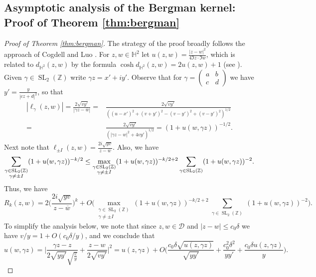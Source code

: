 \documentclass[12pt, a4paper]{amsart}
\newcommand{\tmop}[1]{\ensuremath{\operatorname{#1}}}
\theoremstyle{definition}
\newcommand {\1} {\mathbf{1}}
\newcommand {\Hb} {\mathbb {H}}
\newcommand {\Dc} {\mathcal{D}}
\numberwithin{equation}{section}
\begin{document}
\subsection{Asymptotic analysis of the Bergman kernel: Proof of Theorem \ref{thm:bergman}}
\label{sec:Bergman kernel}

\begin{proof}[Proof of Theorem \ref{thm:bergman}] The strategy of the proof broadly follows the approach of Cogdell and Luo \cite{cogdell-luo-2011}.
For $z,w \in \Hb^{2}$ let
$u(z,w)=\tfrac{|z-w|^2}{4\Im{z}\cdot \Im{w}}$, which is related to $d_{\mathbb H^2}(z,w)$ by the formula $\cosh d_{\mathbb H^2}(z,w)=2u(z,w)+1$ (see \cite[Equation (1.3)]{Iwaniec-2002}).
Given $\gamma \in \tmop{SL}_2(\mathbb Z)$
write $\gamma z=x'+iy'$. Observe that for $\gamma=\begin{pmatrix}
a & b \\
c & d
\end{pmatrix}$ we have $y'=\frac{y}{|cz+d|^2}$, so that
\begin{equation} \label{eq:distance}
\begin{split}
|\ell_{\gamma}(z,w)|=\frac{2\sqrt{vy' }}{|\gamma z-\overline w|}
=& \frac{2\sqrt{vy'}}{((u-x')^2+(v+y')^2-(v-y')^2+(v-y')^2)^{1/2}}\\
=& \frac{2\sqrt{vy'}}{(|\gamma z-w|^2+4vy')^{1/2}}
=(1+u(w,\gamma z))^{-1/2}.
\end{split}
\end{equation}
Next note that $\ell_{\pm I}(z,w)=\tfrac{2i\sqrt{yv}}{z-\overline w}$. Also,
we have
\begin{equation} \notag
\sum_{\substack{\gamma \in
\tmop{SL}_2(\mathbb Z) \\ \gamma \neq \pm I}} (1+u(w,\gamma z))^{-k/2} \le
\max_{\substack{\gamma \in \tmop{SL}_2(\mathbb Z) \\ \gamma\neq \pm I}}(1+u(w,\gamma z))^{-k/2+2}
\sum_{\substack{\gamma \in
\tmop{SL}_2(\mathbb Z) \\ }} (1+u(w,\gamma z))^{-2}.
\end{equation}
Thus, we have
\begin{equation} \label{eq:firststep}
R_k(z,w)=2 \bigg( \frac{2i\sqrt{yv}}{z-\overline w}\bigg)^k+O\bigg( \max_{\substack{\gamma \in \tmop{SL}_2(\mathbb Z) \\ \gamma\neq \pm I}}(1+u(w,\gamma z))^{-k/2+2}
\sum_{\substack{\gamma \in
\tmop{SL}_2(\mathbb Z) \\ }} (1+u(w,\gamma z))^{-2}   \bigg).
\end{equation}
To simplify the analysis below, we note that since $z,w \in \Dc$ and $|z-w| \le c_0 \delta$ we have
 $v/y =1+ O(c_0 \delta/y)$,
and we conclude that
\begin{equation} \label{eq:triangle}
u(w,\gamma z)=\bigg|\frac{\gamma z -z}{2\sqrt{y y'} \sqrt{\frac{v}{y}}}+\frac{z-w}{2\sqrt{vy'}} \bigg|^2
=u(z,\gamma z)+O\bigg(\frac{c_0\delta\sqrt{u(z,\gamma z)}}{\sqrt{yy'}}+\frac{c_0^2 \delta^2}{yy'}+\frac{c_0\delta u(z,\gamma z) }{y}\bigg).
\end{equation}


\end{proof}
\end{document}
